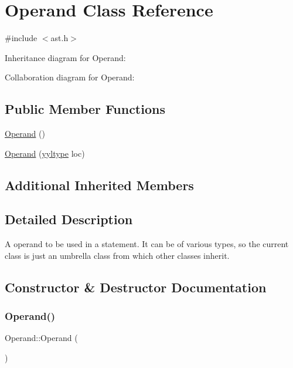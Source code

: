 \hypertarget{class_operand}{}\section{Operand Class Reference}
\label{class_operand}


{\ttfamily \#include $<$ast.\+h$>$}



Inheritance diagram for Operand\+:


Collaboration diagram for Operand\+:
\subsection*{Public Member Functions}
\begin{DoxyCompactItemize}
\item 
\hyperlink{class_operand_a15b10bfa7b65d18a7e9b45ea070ff2f3}{Operand} ()
\item 
\hyperlink{class_operand_aa015348a08a68d9dc2e1d87a20161dc9}{Operand} (\hyperlink{structyyltype}{yyltype} loc)
\end{DoxyCompactItemize}
\subsection*{Additional Inherited Members}


\subsection{Detailed Description}
A operand to be used in a statement. It can be of various types, so the current class is just an umbrella class from which other classes inherit. 

\subsection{Constructor \& Destructor Documentation}
\mbox{\label{class_operand_a15b10bfa7b65d18a7e9b45ea070ff2f3}} 
\subsubsection{\texorpdfstring{Operand()}{Operand()}\hspace{0.1cm}{\footnotesize\ttfamily [1/2]}}
{\footnotesize\ttfamily Operand\+::\+Operand (\begin{DoxyParamCaption}{ }\end{DoxyParamCaption})\hspace{0.3cm}{\ttfamily [inline]}}


